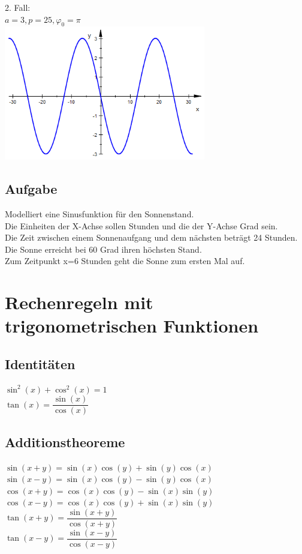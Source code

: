 \documentclass[11pt,final]{scrreprt}
\begin{document}
2. Fall:\\
$ a=3, p=25, \varphi_0=\pi$\\
\includegraphics[width=250pt]{images/sinus_2}\\

\subsection{Aufgabe}
Modelliert eine Sinusfunktion für den Sonnenstand.\\
Die Einheiten der X-Achse sollen Stunden und die der Y-Achse Grad sein.\\
Die Zeit zwischen einem Sonnenaufgang und dem nächsten beträgt 24 Stunden.\\
Die Sonne erreicht bei 60 Grad ihren höchsten Stand.\\
Zum Zeitpunkt x=6 Stunden geht die Sonne zum ersten Mal auf.\\

\section{Rechenregeln mit trigonometrischen Funktionen}
\subsection{Identitäten}
$ \sin^2(x) + \cos^2(x) = 1 $\\
$ \tan(x) = \dfrac{\sin(x)}{\cos(x)} $\\
\subsection{Additionstheoreme}
$\sin(x+y) = \sin(x)\cos(y) + \sin(y)\cos(x)$\\
$\sin(x-y) = \sin(x)\cos(y) - \sin(y)\cos(x)$\\
$\cos(x+y) = \cos(x)\cos(y) - \sin(x)\sin(y)$\\
$\cos(x-y) = \cos(x)\cos(y) + \sin(x)\sin(y)$\\
$\tan(x+y) = \dfrac{\sin(x+y)}{\cos(x+y)}$\\
$\tan(x-y) = \dfrac{\sin(x-y)}{\cos(x-y)}$\\
\end{document}
